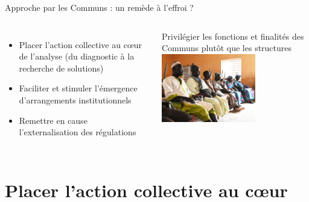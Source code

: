\documentclass[newPxFont]{beamer}
\begin{document}
\begin{frame}[c]{Approche par les Communs : un remède à l'effroi ?}
  \vspace{-1cm}
  \begin{columns}[onlytextwidth,T]
  \column{\dimexpr\linewidth-30mm-5mm}
    \begin{itemize}
      \item Placer l'action collective au cœur de l'analyse (du diagnostic à la recherche de solutions)
      \item Faciliter et stimuler l'émergence d'arrangements institutionnels
      \item Remettre en cause l'externalisation des régulations
    \end{itemize}
    Privilégier les fonctions et finalités des Communs plutôt que les structures
    \column{30mm}
    \vspace{2cm}
      \includegraphics[height=3cm]{img/groupe_diohine.JPG}
  \end{columns}
\end{frame}


\section{Placer l'action collective au cœur}
\end{document}
